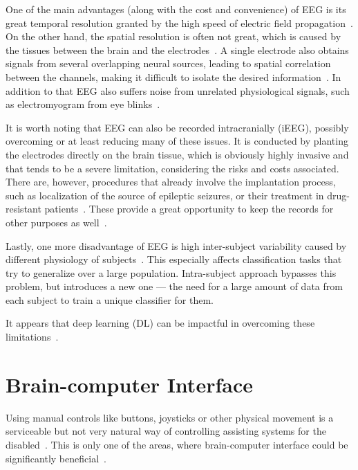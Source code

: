 \documentclass[english, he, bc, kiv, iso690alph, viewonly]{fasthesis}
\begin{document}
One of the main advantages (along with the cost and convenience) of EEG is its great temporal resolution granted by the high speed of electric field propagation~\cite{roy:eeg:review:19}. On the other hand, the spatial resolution is often not great, which is caused by the tissues between the brain and the electrodes~\cite{roy:eeg:review:19, berezutskaya:ieeg:22}. A single electrode also obtains signals from several overlapping neural sources, leading to spatial correlation between the channels, making it difficult to isolate the desired information~\cite{roy:eeg:review:19, luck:erp:book}. In addition to that EEG also suffers noise from unrelated physiological signals, such as electromyogram from eye blinks~\cite{craik:dl:eeg:rev:19}.

It is worth noting that EEG can also be recorded intracranially (iEEG), possibly overcoming or at least reducing many of these issues. It is conducted by planting the electrodes directly on the brain tissue, which is obviously highly invasive and that tends to be a severe limitation, considering the risks and costs associated. There are, however, procedures that already involve the implantation process, such as localization of the source of epileptic seizures, or their treatment in drug-resistant patients~\cite{jobst:iEEG:20}. These provide a great opportunity to keep the records for other purposes as well~\cite{berezutskaya:ieeg:22}.

Lastly, one more disadvantage of EEG is high inter-subject variability caused by different physiology of subjects~\cite{roy:eeg:review:19}. This especially affects classification tasks that try to generalize over a large population. Intra-subject approach bypasses this problem, but introduces a new one --- the need for a large amount of data from each subject to train a unique classifier for them.

It appears that deep learning (DL) can be impactful in overcoming these limitations~\cite{roy:eeg:review:19}.

\section{Brain-computer Interface}
\label{sec:bci}

Using manual controls like buttons, joysticks or other physical movement is a serviceable but not very natural way of controlling assisting systems for the disabled~\cite{he:bci:legs:18}. This is only one of the areas, where brain-computer interface could be significantly beneficial~\cite{craik:dl:eeg:rev:19}.
\end{document}
